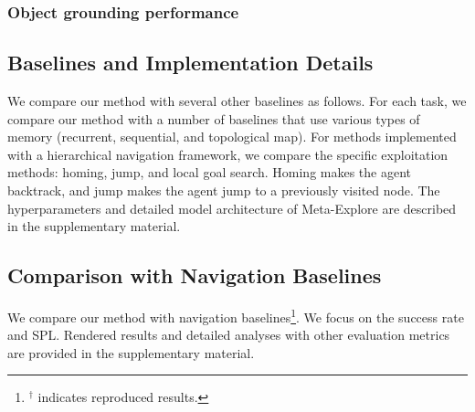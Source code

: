 \documentclass[10pt,twocolumn,letterpaper]{article}
\begin{document}
\subsubsection{Object grounding performance}
\vspace{-0.15cm}
\font=2.5pt
\vspace{-0.1cm}

\subsection{Baselines and Implementation Details}
\vspace{-0.15cm}
We compare our method with several other baselines as follows. For each task, we compare our method with a number of baselines that use various types of memory (recurrent, sequential, and topological map). For methods implemented with a hierarchical navigation framework, we compare the specific exploitation methods: homing, jump, and local goal search. Homing makes the agent backtrack, and jump makes the agent jump to a previously visited node.
The hyperparameters and detailed model architecture of Meta-Explore are described in the supplementary material.
\font=2.5pt
\vspace{-0.15cm}
\subsection{Comparison with Navigation Baselines}
\vspace{-0.15cm}
We compare our method with navigation baselines\footnote{$^\dagger$ indicates reproduced results.}. We focus on the success rate and SPL. Rendered results and detailed analyses with other evaluation metrics are provided in the supplementary material.
\end{document}
